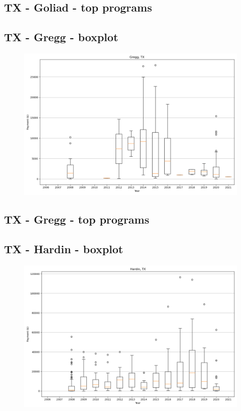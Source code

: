 \subsection*{TX - Goliad - top programs}

\newpage
\subsection*{TX - Gregg - boxplot}
\begin{figure}[h]
\centering
\includegraphics[width=7in]{../output/boxplots/counties/Gregg-TX_boxplot.png}
\end{figure}


\subsection*{TX - Gregg - top programs}

\newpage
\subsection*{TX - Hardin - boxplot}
\begin{figure}[h]
\centering
\includegraphics[width=7in]{../output/boxplots/counties/Hardin-TX_boxplot.png}
\end{figure}


